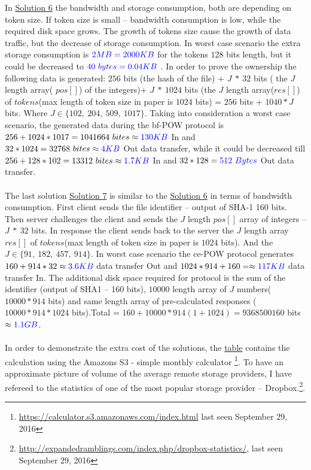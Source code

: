 \documentclass[12pt]{article}
\begin{document}
In \hyperref[sub:Soltuion6]{Solution 6} the bandwidth  and storage consumption, both are depending on token size. If token size is small -- bandwidth consumption is low, while the required disk space grows. The growth of tokens size cause the growth of data traffic, but the  decrease  of storage consumption. In worst case scenario the extra storage consumption is $\color{blue}2MB=2000KB$ for the tokens $128$ bits length, but it could be decreased to $\color{blue}40\ bytes=0.04KB$ . In order to prove the ownership the following data is generated: $256$ bits (the hash of the file)  +  $J\ *\ 32 $ bits ( the $J$ length array( $pos []$) of the integers)+ $J\ *\ 1024$ bits (the $J$ length array($res[]$) of $tokens$(max length of token size in paper is $1024$ bits) = $256$ bits + $1040*J$ bits. Where $J \in \{102,\ 204,\ 509,\ 1017\}$. Taking into consideration a worst case scenario, the generated data during the bf-POW protocol is $256 + 1024*1017 = 1041664\ bites\approx \color{blue}130KB$ In and $32*1024=32768\ bites\approx \color{blue}4KB $ Out data transfer, while it could be decreased till $256+128*102=13312\ bites\approx\color{blue}1.7KB$ In and $32*128= \color{blue}512\ Bytes$ Out data transfer.\\\\
The last solution \hyperref[sub:Soltuion7]{Solution 7} is similar to the \hyperref[sub:Soltuion6]{Solution 6} in terms of bandwidth consumption. First client sends the file identifier -- output of SHA-1 160 bits. Then server challenges the client and sends the $J$ length $pos[]$ array of integers -- $J\ *\ 32$ bits. In response the client  sends back to the server the $J$ length array $res[]$ of $tokens$(max length of token size in paper is $1024$ bits). And the  $J \in \{91,\ 182,\ 457,\ 914\}$. In worst case scenario the ce-POW protocol generates $160+914*32\approx \color{blue} 3.6 KB$ data transfer Out and  $1024*914+160=\approx \color{blue} 117 KB$ data transfer In. The additional disk space required for protocol is the sum of the identifier (output of SHA1 -- 160 bits), $10 000$ length array of $J$ numbers($10000*914$ bits) and same length array of pre-calculated responses ($10000*914*1024$ bits).Total = $160 + 10000*914(1+1024)=9368500160$ bits $\approx \color{blue} 1.1 GB $.\\\\
In order to demonstrate the extra cost of the solutions, the \hyperref[table:AWS-S3]{table} contains the calculation using the Amazons S3 - simple monthly calculator \footnote{\url{https://calculator.s3.amazonaws.com/index.html} last seen September 29, 2016}. To have an approximate  picture of  volume of the average remote storage providers, I have refereed to the statistics of one of the most popular storage provider -- Dropbox.\footnote{\url{http://expandedramblings.com/index.php/dropbox-statistics/}, last seen September 29, 2016 }.
\end{document}
